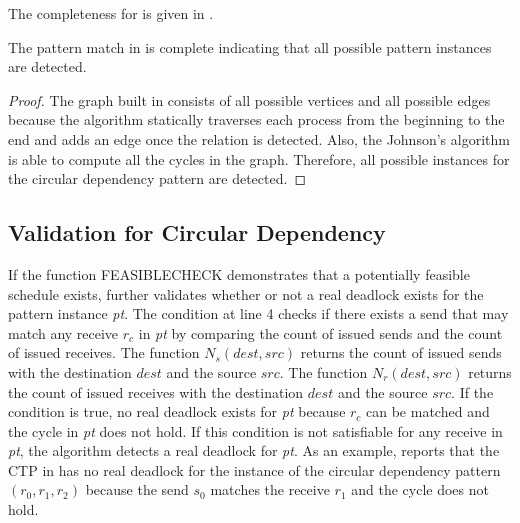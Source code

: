 The completeness for  is given in . 

\begin{lemma}
\label{lemma:pmcircular}
The pattern match in  is complete indicating that all possible pattern instances are detected.
\end{lemma}
\begin{proof}
The graph built in  consists of all possible vertices and all possible edges because the algorithm statically traverses each process from the beginning to the end and adds an edge once the relation is detected. Also, the Johnson's algorithm is able to compute all the cycles in the graph. Therefore, all possible instances for the circular dependency pattern are detected. 
\end{proof}

\subsection{Validation for Circular Dependency}


If the function \textrm{FEASIBLECHECK} demonstrates that a potentially feasible schedule exists,  further validates whether or not a real deadlock exists for the pattern instance \textit{pt}. The condition at line 4 checks if there exists a send that may match any receive $\mathit{r_c}$ in \textit{pt} by comparing the count of issued sends and the count of issued receives.    
The function $\mathit{N_s}(\mathit{dest},\mathit{src})$ returns the count of issued sends with the destination $\mathit{dest}$ and the source $\mathit{src}$. The function $\mathit{N_r}(\mathit{dest},\mathit{src})$ returns the count of issued receives with the destination $\mathit{dest}$ and the source $\mathit{src}$.
If the condition is true, no real deadlock exists for \textit{pt} because $\mathit{r_c}$ can be matched and the cycle in \textit{pt} does not hold. If this condition is not satisfiable for any receive in \textit{pt}, the algorithm detects a real deadlock for \textit{pt}.
As an example,  reports that the CTP in  has no real deadlock for the instance of the circular dependency pattern $(r_0,r_1,r_2)$ because the send $s_0$ matches the receive $r_1$ and the cycle does not hold.


